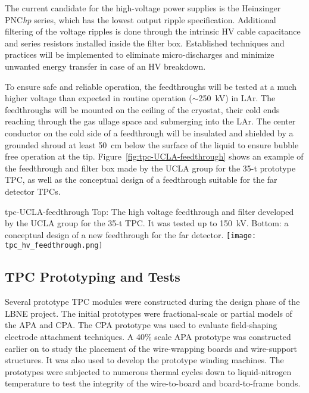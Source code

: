 The current candidate for the high-voltage power supplies is the
Heinzinger PNC{\it hp} series, which has the lowest output ripple
specification.  Additional filtering of the voltage ripples is done
through the intrinsic HV cable capacitance and series resistors
installed inside the filter box. Established techniques and practices
will be implemented to eliminate micro-discharges and minimize
unwanted energy transfer in case of an HV breakdown.
  
To ensure safe and reliable operation, the feedthroughs will be tested
at a much higher voltage than expected in routine operation
($\sim$250~kV) in LAr. The feedthroughs will be mounted on
the ceiling of the cryostat, their cold ends reaching through the gas
ullage space and submerging into the LAr. The center
conductor on the cold side of a feedthrough will be insulated and
shielded by a grounded shroud at least 50~cm below the surface of the
liquid to ensure bubble free operation at the
tip. Figure~\ref{fig:tpc-UCLA-feedthrough} shows an example of the
feedthrough and filter box made by the UCLA group for the 35-t prototype TPC,
as well as the conceptual design of a feedthrough suitable for the far
detector TPCs.
\begin{cdrfigure}{tpc-UCLA-feedthrough}
{Top: The high voltage feedthrough and filter developed by the UCLA 
group for the 35-t TPC.  It was tested up to 150~kV.  
Bottom: a conceptual design of a new feedthrough for the far detector.}
\texttt{[image: tpc\_hv\_feedthrough.png]}
\end{cdrfigure}



\subsection{TPC Prototyping and Tests}
\label{subsec:fd-ref-tpc-proto}


Several prototype TPC modules were constructed during the design phase
of the LBNE project. The initial prototypes were fractional-scale
or partial models of the APA and CPA. The CPA prototype was used to
evaluate field-shaping electrode attachment techniques. A 40\% scale
APA prototype was constructed earlier on to study the placement of the
wire-wrapping boards and wire-support structures. It was also used to
develop the prototype winding machines. The prototypes were subjected
to numerous thermal cycles down to liquid-nitrogen temperature to test
the integrity of the wire-to-board and board-to-frame bonds.

